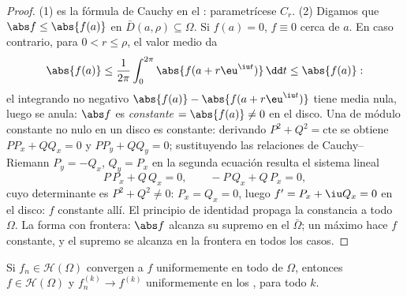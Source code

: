 \begin{proof}
(1) es la fórmula de Cauchy en el :
parametrícese $C_r$. (2) Digamos que $\abs f \leq \abs{f(a)}$ en
$\bar D(a, \rho)
\subseteq \Omega$. Si $f(a) = 0$, $f \equiv 0$ cerca de $a$. En caso
contrario, para $0 < r \leq \rho$, el valor medio da
\[
\abs{f(a)} \leq \frac1{2\pi}\int_0^{2\pi}\abs{f(a +
r\eu^{\iu t})}\,\dd t \leq \abs{f(a)} :
\]
el integrando  no negativo
$\abs{f(a)} - \abs{f(a +
r\eu^{\iu t})}$ tiene media nula, luego se anula: $\abs f$ es
\emph{constante} $= \abs{f(a)} \ne 0$ en el disco. Una
 de módulo constante
no nulo en un disco es constante: derivando $P^2 + Q^2 = \text{cte}$
se obtiene $PP_x + QQ_x
= 0$ y $PP_y + QQ_y = 0$; sustituyendo las relaciones de Cauchy--Riemann
$P_y = -Q_x$, $Q_y = P_x$ en la segunda ecuación resulta el sistema
lineal
\[
P\,P_x + Q\,Q_x = 0, \qquad -P\,Q_x + Q\,P_x = 0,
\]
cuyo determinante es $P^2 + Q^2 \neq 0$: $P_x = Q_x = 0$, luego
$f' = P_x + \iu Q_x = 0$ en el disco: $f$ constante allí. El principio
de identidad propaga la constancia a todo $\Omega$. La forma con
frontera: $\abs f$ alcanza su supremo en el
 $\bar\Omega$; un máximo
 hace $f$ constante, y el
supremo se alcanza en la frontera en todos los casos.
\end{proof}

\begin{theorem}
\label{thm:b3:holomorphic:weierstrassconv}
Si $f_n \in \mathcal H(\Omega)$ convergen a $f$ uniformemente en todo
 de $\Omega$, entonces
$f \in \mathcal
H(\Omega)$ y $f_n^{(k)} \to f^{(k)}$ uniformemente en los
, para todo
$k$.
\end{theorem}

